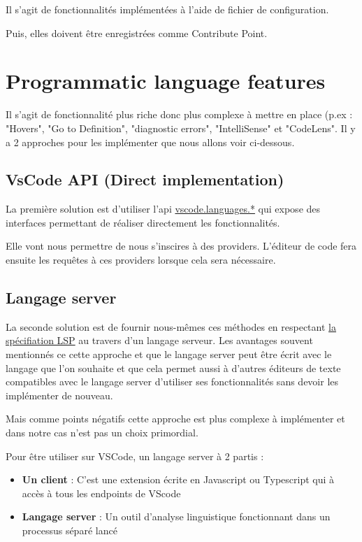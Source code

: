\documentclass[
    iict, %
    il, %
]{heig-tb}
\begin{document}
Il s'agit de fonctionnalités implémentées à l'aide de fichier de configuration.

Puis, elles doivent être enregistrées comme Contribute Point.

\section{Programmatic language features}
Il s'agit de fonctionnalité plus riche donc plus complexe à mettre en place (p.ex : "Hovers", "Go to Definition", "diagnostic errors", "IntelliSense" \space et "CodeLens".
Il y a 2 approches pour les implémenter que nous allons voir ci-dessous.

\subsection{VsCode API (Direct implementation)}
La première solution est d'utiliser l'api \href{https://code.visualstudio.com/api/references/vscode-api#languages}{vscode.languages.*} qui expose des interfaces
permettant de réaliser directement les fonctionnalités.

Elle vont nous permettre de nous s'inscires à des providers. L'éditeur de code fera ensuite les requêtes à ces providers lorsque cela sera nécessaire.

\subsection{Langage server}
La seconde solution est de fournir nous-mêmes ces méthodes en respectant \href{https://microsoft.github.io/language-server-protocol/specifications/lsp/3.17/specification/}{la spécifiation LSP} au travers d'un langage serveur.
Les avantages souvent mentionnés ce cette approche et que le langage server peut être écrit avec le langage que l'on souhaite et
que cela permet aussi à d'autres éditeurs de texte compatibles avec le langage server d'utiliser ses fonctionnalités sans devoir les implémenter de nouveau.

Mais comme points négatifs cette approche est plus complexe à implémenter et dans notre cas n'est pas un choix primordial.

Pour être utiliser sur VSCode, un langage server à 2 partis :
\begin{itemize}
    \item \textbf{Un client} : C'est une extension écrite en Javascript ou Typescript qui à accès à tous les endpoints de VScode
    \item \textbf{Langage server} : Un outil d'analyse linguistique fonctionnant dans un processus séparé lancé
\end{itemize}
\end{document}
